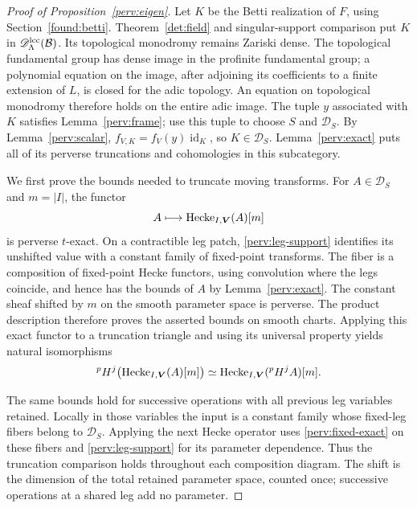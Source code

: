\begin{proof}[Proof of Proposition~\ref{perv:eigen}]
Let $K$ be the Betti realization of $F$, using
Section~\ref{found:betti}.  Theorem~\ref{det:field} and singular-support
comparison put $K$ in $\mathscr D^{\mathrm{lcc}}_\Lambda(\mathcal B)$.
Its topological monodromy remains Zariski dense.  The topological
fundamental group has dense image in the profinite fundamental group;
a polynomial equation on the image, after adjoining its coefficients
to a finite extension of $L$, is closed for the adic topology.  An
equation on topological monodromy therefore holds on the entire adic
image.  The tuple $y$ associated with $K$ satisfies
Lemma~\ref{perv:frame}; use this tuple to choose $S$ and $\mathscr D_S$.
By Lemma~\ref{perv:scalar},
$f_{V,K}=f_V(y)\operatorname{id}_K$, so $K\in\mathscr D_S$.
Lemma~\ref{perv:exact} puts all of its perverse truncations and
cohomologies in this subcategory.

We first prove the bounds needed to truncate moving transforms.
For $A\in\mathscr D_S$ and $m=|I|$, the functor
\[
                 A\longmapsto\operatorname{Hecke}_{I,\boldsymbol V}(A)[m]
\]
is perverse $t$-exact.  On a contractible leg patch,
\eqref{perv:leg-support} identifies its unshifted value with a constant
family of fixed-point transforms.  The fiber is a composition of
fixed-point Hecke functors, using convolution where the legs coincide,
and hence has the bounds of $A$ by Lemma~\ref{perv:exact}.
The constant sheaf shifted by $m$ on the smooth parameter space is
perverse.  The product description therefore proves the asserted bounds
on smooth charts.  Applying this exact functor to a truncation triangle
and using its universal property yields natural isomorphisms
\begin{equation}\label{perv:moving-truncation}
 {}^pH^j\bigl(\operatorname{Hecke}_{I,\boldsymbol V}(A)[m]\bigr)
       \simeq\operatorname{Hecke}_{I,\boldsymbol V}({}^pH^jA)[m].
\end{equation}

The same bounds hold for successive operations with all previous leg
variables retained.  Locally in those variables the input is a constant
family whose fixed-leg fibers belong to $\mathscr D_S$.  Applying the
next Hecke operator uses \eqref{perv:fixed-exact} on these fibers and
\eqref{perv:leg-support} for its parameter dependence.  Thus the
truncation comparison holds throughout each composition diagram.
The shift is the dimension of the total retained parameter space,
counted once; successive operations at a shared leg add no parameter.


\end{proof}

